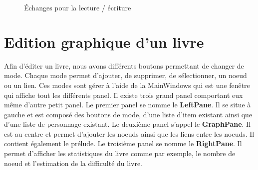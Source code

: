			\begin{figure}[H]
				\begin{center}
				\end{center}
				\caption{Échanges pour la lecture / écriture}
			\end{figure}

	\section{Edition graphique d'un livre}
		Afin d'éditer un livre, nous avons différents boutons permettant de changer de mode. Chaque mode permet d'ajouter, de supprimer, de sélectionner, un noeud ou un lien. Ces modes sont gérer à l'aide de la MainWindows qui est une fenêtre qui affiche tout les différents panel. Il existe trois grand panel comportant eux même d'autre petit panel. Le premier panel se nomme le \textbf{LeftPane}. Il se situe à gauche et est composé des boutons de mode, d'une liste d'item existant ainsi que d'une liste de personnage existant. Le deuxième panel s'appel le \textbf{GraphPane}. Il est au centre et permet d'ajouter les noeuds ainsi que les liens entre les noeuds. Il contient également le prélude. Le troisième panel se nomme le \textbf{RightPane}. Il permet d'afficher les statistiques du livre comme par exemple, le nombre de noeud et l'estimation de la difficulté du livre.\\

